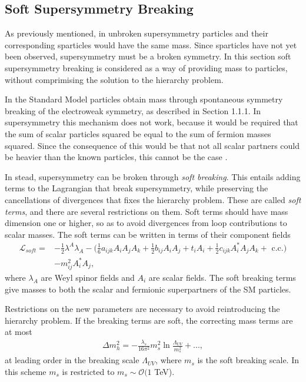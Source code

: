 \documentclass[twoside,english]{uiofysmaster}
\begin{document}
\subsection{Soft Supersymmetry Breaking}

As previously mentioned, in unbroken supersymmetry particles and their corresponding sparticles would have the same mass. Since sparticles have not yet been observed, supersymmetry must be a broken symmetry. In this section soft supersymmetry breaking is considered as a way of providing mass to particles, without comprimising the solution to the hierarchy problem.

In the Standard Model particles obtain mass through spontaneous symmetry breaking of the electroweak symmetry, as described in Section 1.1.1. In supersymmetry this mechanism does not work, because it would be required that the sum of scalar particles squared be equal to the sum of fermion masses squared. Since the consequence of this would be that not all scalar partners could be heavier than the known particles, this cannot be the case \cite{batzing2017lecture}. 

In stead, supersymmetry can be broken through \textit{soft breaking}. This entails adding terms to the Lagrangian that break supersymmetry, while preserving the cancellations of divergences that fixes the hierarchy problem. These are called \textit{soft terms}, and there are several restrictions on them. Soft terms should have mass dimension one or higher, so as to avoid divergences from loop contributions to scalar masses. The soft terms can be written in terms of their component fields
\begin{align}
\mathcal{L}_{soft} =& - \frac{1}{2} \lambda^A \lambda_A - \Big(\frac{1}{6} a_{ijk} A_i A_j A_k + \frac{1}{2} b_{ij} A_i A_j + t_i A_i + \frac{1}{2} c_{ijk} A^{*}_i A_jA_k + \text{ c.c.} \Big) \nonumber \\& - m_{ij}^2 A_i^*A_j,
\end{align}
where $\lambda_A$ are Weyl spinor fields and $A_i$ are scalar fields. The soft breaking terms give masses to both the scalar and fermionic superpartners of the SM particles.

Restrictions on the new parameters are necessary to avoid reintroducing the hierarchy problem. If the breaking terms are soft, the correcting mass terms are at most
\begin{align*}
\Delta m_h^2 = - \frac{\lambda_s}{16 \pi^2} m_s^2\ln \frac{\Lambda_{UV}}{m_s^2} +...,
\end{align*}
at leading order in the breaking scale $\Lambda_{UV}$, where $m_s$ is the soft breaking scale. In this scheme $m_s$ is restricted to $m_s \sim \mathcal{O}(1$ TeV).
\end{document}
